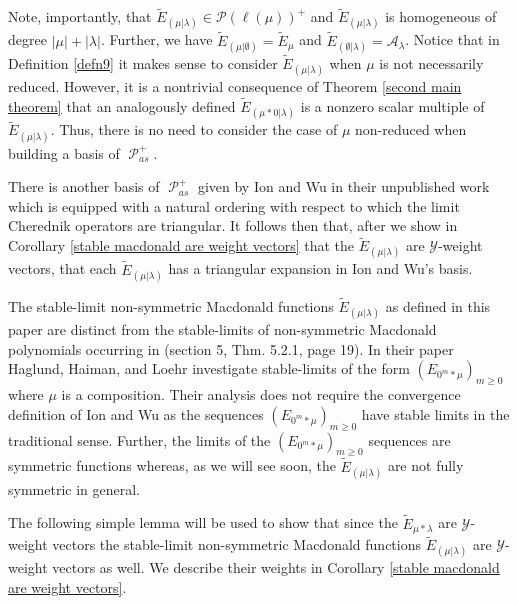 \documentclass[ALCO,Unicode]{cedram}
\newcommand{\y}{{ \mathscr{Y} }}
\DeclareMathOperator{\sP}{\mathscr{P} }
\begin{document}
\begin{rema}
     Note, importantly, that $\widetilde{E}_{(\mu|\lambda)} \in \mathscr{P}(\ell(\mu))^{+}$ and $\widetilde{E}_{(\mu|\lambda)}$ is homogeneous of degree $|\mu| + |\lambda|$. Further, we have $\widetilde{E}_{(\mu|\emptyset)} = \widetilde{E}_{\mu}  $ and $\widetilde{E}_{(\emptyset |\lambda)} = \mathcal{A}_{\lambda}$. Notice that in Definition \ref{defn9} it makes sense to consider $\widetilde{E}_{(\mu|\lambda)}$ when $\mu$ is not necessarily reduced. However, it is a nontrivial consequence of Theorem \ref{second main theorem} that an analogously defined $\widetilde{E}_{(\mu*0|\lambda)}$ is a nonzero scalar multiple of $\widetilde{E}_{(\mu|\lambda)}.$ Thus, there is no need to consider the case of $\mu$ non-reduced when building a basis of $\sP_{as}^{+}.$

     There is another basis of $\sP_{as}^{+}$ given by Ion and Wu in their unpublished work \cite{IW_2022} which is equipped with a natural ordering with respect to which the limit Cherednik operators are triangular. It follows then that, after we show in Corollary \ref{stable macdonald are weight vectors} that the $\widetilde{E}_{(\mu|\lambda)}$ are $\y$-weight vectors, that each $\widetilde{E}_{(\mu|\lambda)}$ has a triangular expansion in Ion and Wu's basis.
\end{rema}

\begin{rema}
    The stable-limit non-symmetric Macdonald functions $\widetilde{E}_{(\mu|\lambda)}$ as defined in this paper are distinct from the stable-limits of non-symmetric Macdonald polynomials occurring in \cite{haglund2007combinatorial} (section 5, Thm. 5.2.1, page 19). In their paper Haglund, Haiman, and Loehr investigate stable-limits of the form $(E_{0^m* \mu})_{m \geq 0}$ where $\mu$ is a composition. Their analysis does not require the convergence definition of Ion and Wu as the sequences $(E_{0^m* \mu})_{m \geq 0}$ have stable limits in the traditional sense. Further, the limits of the $(E_{0^m* \mu})_{m \geq 0}$ sequences are symmetric functions whereas, as we will see soon, the $\widetilde{E}_{(\mu|\lambda)}$ are not fully symmetric in general. 
\end{rema}

The following simple lemma will be used to show that since the $\widetilde{E}_{\mu*\lambda}$ are $\y$-weight vectors the stable-limit non-symmetric Macdonald functions $\widetilde{E}_{(\mu|\lambda)}$ are $\y$-weight vectors as well. We describe their weights in Corollary \ref{stable macdonald are weight vectors}.
\end{document}
